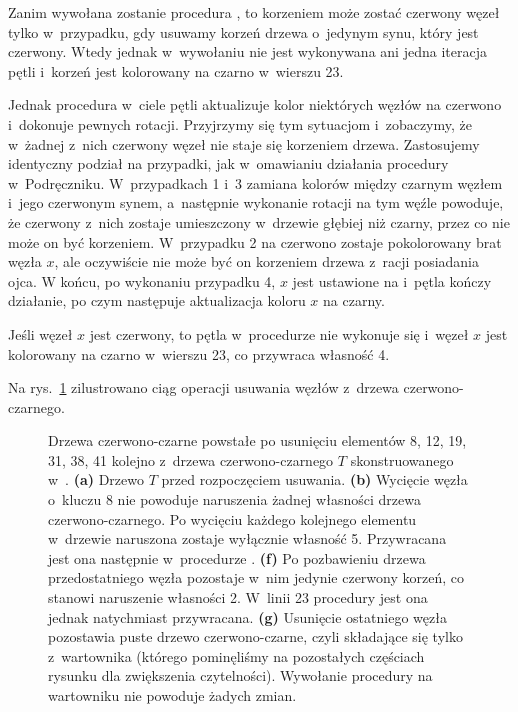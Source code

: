 \bignegskip

\exercise %
Zanim wywołana zostanie procedura , to korzeniem może zostać czerwony węzeł tylko w~przypadku, gdy usuwamy korzeń drzewa o~jedynym synu, który jest czerwony.
Wtedy jednak w~wywołaniu  nie jest wykonywana ani jedna iteracja pętli  i~korzeń jest kolorowany na czarno w~wierszu 23.

Jednak procedura  w~ciele pętli aktualizuje kolor niektórych węzłów na czerwono i~dokonuje pewnych rotacji.
Przyjrzymy się tym sytuacjom i~zobaczymy, że w~żadnej z~nich czerwony węzeł nie staje się korzeniem drzewa.
Zastosujemy identyczny podział na przypadki, jak w~omawianiu działania procedury w~Podręczniku.
W~przypadkach 1 i~3 zamiana kolorów między czarnym węzłem i~jego czerwonym synem, a~następnie wykonanie rotacji na tym węźle powoduje, że czerwony z~nich zostaje umieszczony w~drzewie głębiej niż czarny, przez co nie może on być korzeniem.
W~przypadku 2 na czerwono zostaje pokolorowany brat węzła $x$, ale oczywiście nie może być on korzeniem drzewa z~racji posiadania ojca.
W końcu, po wykonaniu przypadku 4, $x$ jest ustawione na  i~pętla kończy działanie, po czym następuje aktualizacja koloru $x$ na czarny.

\exercise %
Jeśli węzeł $x$ jest czerwony, to pętla  w~procedurze  nie wykonuje się i~węzeł $x$ jest kolorowany na czarno w~wierszu 23, co przywraca własność 4.

\exercise %
Na rys.\ \ref{fig:13.4-3} zilustrowano ciąg operacji usuwania węzłów z~drzewa czerwono-czarnego.
\begin{figure}[!ht]
	\centering 
	\caption{Drzewa czerwono-czarne powstałe po usunięciu elementów 8, 12, 19, 31, 38, 41 kolejno z~drzewa czerwono-czarnego $T$ skonstruowanego w~.
	{\sffamily\bfseries(a)} Drzewo $T$ przed rozpoczęciem usuwania.
	{\sffamily\bfseries(b)} Wycięcie węzła o~kluczu 8 nie powoduje naruszenia żadnej własności drzewa czerwono-czarnego.
	{\sffamily\bfseries{}} Po wycięciu każdego kolejnego elementu w~drzewie naruszona zostaje wyłącznie własność 5.
	Przywracana jest ona następnie w~procedurze .
	{\sffamily\bfseries{(f)}} Po pozbawieniu drzewa przedostatniego węzła pozostaje w~nim jedynie czerwony korzeń, co stanowi naruszenie własności 2.
        W~linii 23 procedury  jest ona jednak natychmiast przywracana.
        {\sffamily\bfseries{(g)}} Usunięcie ostatniego węzła pozostawia puste drzewo czerwono-czarne, czyli składające się tylko z~wartownika  (którego pominęliśmy na pozostałych częściach rysunku dla zwiększenia czytelności).
        Wywołanie procedury  na wartowniku nie powoduje żadych zmian.} \label{fig:13.4-3}
\end{figure}

